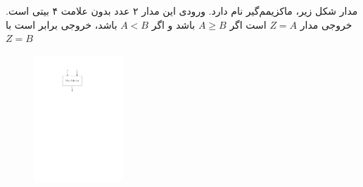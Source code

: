 
مدار شکل زیر، ماکزیمم‌گیر نام دارد. ورودی این مدار ۲ عدد بدون علامت
۴ بیتی است. خروجی مدار $Z=A$ است اگر $A\geq B$ باشد و اگر $A < B$ باشد، خروجی برابر است با $Z=B$


\begin{figure}[h]
	\centering
	\includegraphics[width=0.3\textwidth]{fig/Q_bonus_a.pdf}
	\label{fig:bonus_a}
\end{figure}


